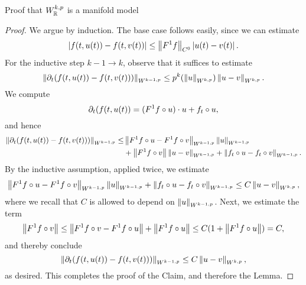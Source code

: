 \documentclass{amsart}
\begin{document}
\begin{clear}{Proof that $W^{k,p}_{\mathbb{R}}$ is a manifold model}
\begin{proof}
    We argue by induction. The base case follows easily, since we can estimate
    \begin{equation*}
      \left|f(t,u(t))-f(t,v(t))\right|\le \left\lVert F^{1}f\right\rVert_{C^{0}}\left|u(t)-v(t)\right|.
    \end{equation*}
    For the inductive step $k-1\to k$, observe that it suffices to estimate
    \begin{equation*}
      \left\lVert\partial_{t}(f(t,u(t))-f(t,v(t)))\right\rVert_{W^{k-1,p}}\le p^{k}(\left\lVert u\right\rVert_{W^{k,p}})\left\lVert u-v\right\rVert_{W^{k,p}}.
    \end{equation*}
    We compute
    \begin{equation*}
      \partial_{t}(f(t,u(t))=(F^{1}f\circ u)\cdot u+f_{t}\circ u,
    \end{equation*}
    and hence
    \begin{equation*}
      \begin{aligned}
        \left\lVert\partial_{t}(f(t,u(t))-f(t,v(t)))\right\rVert_{W^{k-1,p}}\le &\left\lVert F^{1}f\circ u-F^{1}f\circ v\right\rVert_{W^{k-1,p}}\left\lVert u\right\rVert_{W^{k-1,p}}\\
        &+\left\lVert F^{1}f\circ v\right\rVert\left\lVert u-v\right\rVert_{W^{k-1,p}}+\left\lVert f_{t}\circ u-f_{t}\circ v\right\rVert_{W^{k-1,p}}.
      \end{aligned}
    \end{equation*}
    By the inductive assumption, applied twice, we estimate
    \begin{equation*}
      \left\lVert F^{1}f\circ u-F^{1}f\circ v\right\rVert_{W^{k-1,p}}\left\lVert u\right\rVert_{W^{k-1,p}}+\left\lVert f_{t}\circ u-f_{t}\circ v\right\rVert_{W^{k-1,p}}\le C\left\lVert u-v\right\rVert_{W^{k,p}},
    \end{equation*}
    where we recall that $C$ is allowed to depend on $\left\lVert u\right\rVert_{W^{k-1,p}}$.
    Next, we estimate the term
    \begin{equation*}
      \left\lVert F^{1}f\circ v\right\rVert\le \left\lVert F^{1}f\circ v-F^{1}f\circ u\right\rVert+\left\lVert F^{1}f\circ u\right\rVert\le C(1+\left\lVert F^{1}f\circ u\right\rVert)=C,
    \end{equation*}
    and thereby conclude
    \begin{equation*}
      \left\lVert\partial_{t}(f(t,u(t))-f(t,v(t)))\right\rVert_{W^{k-1,p}}\le C\left\lVert u-v\right\rVert_{W^{k,p}},
    \end{equation*}
    as desired. This completes the proof of the Claim, and therefore the Lemma.
\end{proof}
\end{clear}
\end{document}
